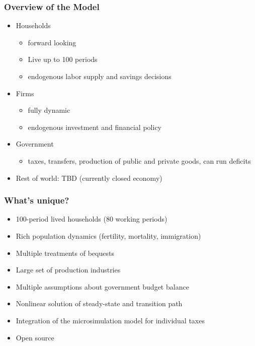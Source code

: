 \documentclass{beamer}
\begin{document}
  \begin{frame}
    \frametitle{Overview of the Model}
    \begin{itemize}
      \item Households
        \begin{itemize}
          \item forward looking
          \item Live up to 100 periods
          \item endogenous labor supply and savings decisions
        \end{itemize}
      \vspace{3mm}
      \item Firms
        \begin{itemize}
          \item fully dynamic
          \item endogenous investment and financial policy
        \end{itemize}
      \vspace{3mm}
      \item Government
        \begin{itemize}
          \item taxes, transfers, production of public and private goods, can run deficits
        \end{itemize}
      \vspace{3mm}
      \item Rest of world: TBD (currently closed economy)
    \end{itemize}
  \end{frame}


  \begin{frame}
    \frametitle{What's unique?}
    \begin{itemize}
      \item 100-period lived households (80 working periods)
      \vspace{2mm}
      \item Rich population dynamics (fertility, mortality, immigration)
      \vspace{2mm}
      \item Multiple treatments of bequests
      \vspace{2mm}
      \item Large set of production industries
      \vspace{2mm}
      \item Multiple assumptions about government budget balance
      \vspace{2mm}
      \item Nonlinear solution of steady-state and transition path
      \vspace{2mm}
      \item Integration of the microsimulation model for individual taxes
      \vspace{2mm}
      \item Open source
    \end{itemize}
  \end{frame}
\end{document}
